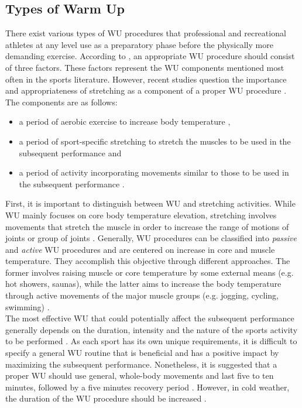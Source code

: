 \subsection{Types of Warm Up}
There exist various types of WU procedures that professional and recreational athletes at any level use as a preparatory phase before the physically more demanding exercise. According to \cite{safran1989warm}, an appropriate WU procedure should consist of three factors. These factors represent the WU components mentioned most often in the sports literature. However, recent studies question the importance and appropriateness of stretching as a component of a proper WU procedure \cite{pereles2012large}. The components are as follows:
\begin{itemize}
\item a period of aerobic exercise to increase body
temperature \cite{safran1989warm},
\item a period of sport-specific stretching to stretch 
the muscles to be used in the subsequent
performance \cite{safran1989warm} and
\item a period of activity incorporating movements
similar to those to be used in the subsequent
performance \cite{safran1989warm}.
\end{itemize}  
First, it is important to distinguish between WU and stretching activities. While WU mainly focuses on core body temperature elevation, stretching involves movements that stretch the muscle in order to increase the range of motions of joints or group of joints \cite{knudson2008warm}. 
Generally, WU procedures can be classified into \textit{passive} and \textit{active} WU procedures and are centered on increase in core and muscle temperature. They accomplish this objective through different approaches. The former involves raising muscle or core temperature by some external means (e.g. hot showers, saunas), while the latter aims to increase the body temperature through active movements of the major muscle groups (e.g. jogging, cycling, swimming) \cite{bishop2003warm2, shellock1985warming}. \\The most effective WU that could potentially affect the subsequent performance generally depends on the duration, intensity and the nature of the sports activity to be performed \cite{bishop2003warm2}. As each sport has its own unique requirements, it is difficult to specify a general WU routine that is beneficial and has a positive impact by maximizing the subsequent performance. Nonetheless, it is suggested that a proper WU should use general, whole-body movements and last five to ten minutes, followed by a five minutes recovery period \cite{bishop2003warm2}. However, in cold weather, the duration of the WU procedure should be increased \cite{mayr2015prevention}. %

